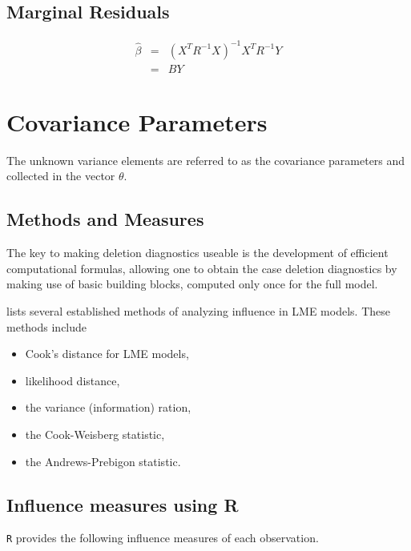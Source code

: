 \documentclass[12pt, a4paper]{article}
\begin{document}
			\subsection{Marginal Residuals}
			\begin{eqnarray}
			\hat{\beta} &=& (X^{T}R^{-1}X)^{-1}X^{T}R^{-1}Y \nonumber \\
			&=& BY \nonumber
			\end{eqnarray}
			
			
			\section{Covariance Parameters} %
			The unknown variance elements are referred to as the covariance parameters and collected in the vector $\theta$.
			
			\subsection{Methods and Measures}
			The key to making deletion diagnostics useable is the development of efficient computational formulas, allowing one to obtain the  case deletion diagnostics by making use of basic building blocks, computed only once for the full model.
			
			\citet{Zewotir} lists several established methods of analyzing influence in LME models. These methods include \begin{itemize}
				\item Cook's distance for LME models,
				\item {} likelihood distance,
				\item the variance (information) ration,
				\item the  Cook-Weisberg statistic,
				\item the  Andrews-Prebigon statistic.
			\end{itemize}
			
			
			
			
			
			
			
			
			\subsection{Influence measures using R} %
			\texttt{R} provides the following influence measures of each observation.
			
\end{document}
